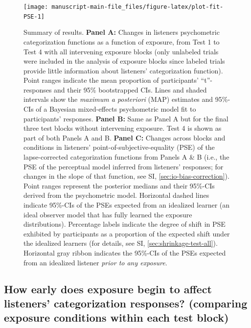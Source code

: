 \documentclass[
  11pt,
  man,mask,floatsintext]{apa6}
\begin{document}
\begin{landscape}







\begin{figure}

{\centering \texttt{[image: manuscript-main-file\_files/figure-latex/plot-fit-PSE-1]} 

}

\caption{Summary of results. \textbf{Panel A:} Changes in listeners psychometric categorization functions as a function of exposure, from Test 1 to Test 4 with all intervening exposure blocks (only unlabeled trials were included in the analysis of exposure blocks since labeled trials provide little information about listeners' categorization function). Point ranges indicate the mean proportion of participants' ``t''-responses and their 95\% bootstrapped CIs. Lines and shaded intervals show the \emph{maximum a posteriori} (MAP) estimates and 95\%-CIs of a Bayesian mixed-effects psychometric model fit to participants' responses. \textbf{Panel B:} Same as Panel A but for the final three test blocks without intervening exposure. Test 4 is shown as part of both Panels A and B. \textbf{Panel C:} Changes across blocks and conditions in listeners' point-of-subjective-equality (PSE) of the lapse-corrected categorization functions from Panels A \& B (i.e., the PSE of the perceptual model inferred from listeners' responses; for changes in the slope of that function, see SI, \ref{sec:io-bias-correction}). Point ranges represent the posterior medians and their 95\%-CIs derived from the psychometric model. Horizontal dashed lines indicate 95\%-CIs of the PSEs expected from an idealized learner (an ideal observer model that has fully learned the exposure distributions). Percentage labels indicate the degree of shift in PSE exhibited by participants as a proportion of the expected shift under the idealized learners (for details, see SI, \ref{sec:shrinkage-test-all}). Horizontal gray ribbon indicates the 95\%-CIs of the PSEs expected from an idealized listener \emph{prior to any exposure}.}\label{fig:plot-fit-PSE}
\end{figure}

\end{landscape}

\subsection{How early does exposure begin to affect listeners' categorization responses? (comparing exposure conditions within each test block)}\label{how-early-does-exposure-begin-to-affect-listeners-categorization-responses-comparing-exposure-conditions-within-each-test-block}
\end{document}
